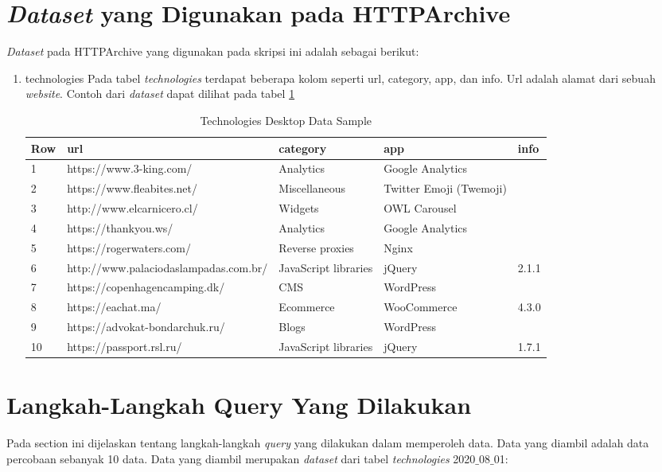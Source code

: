 \section{\textit{Dataset} yang Digunakan pada HTTPArchive}
\textit{Dataset} pada HTTPArchive yang digunakan pada skripsi ini adalah sebagai berikut:
\begin{enumerate}
	\item technologies
	Pada tabel \textit{technologies} terdapat beberapa kolom seperti url, category, app, dan info. Url adalah alamat dari sebuah \textit{website}. Contoh dari \textit{dataset} dapat dilihat pada tabel \ref{table:ct_tech_desktop} 
	\begin{table}[H]
		\centering
		\begin{tabular}{|l|l|p{3cm}|p{3cm}|l|}
			\hline
			\textbf{Row} & \textbf{url} & \textbf{category} & app & info\\
			\hline
			1 & https://www.3-king.com/ & Analytics & Google Analytics & \\
			\hline
			2 & https://www.fleabites.net/ & Miscellaneous & Twitter Emoji (Twemoji) & \\
			\hline
			3 & http://www.elcarnicero.cl/ & Widgets & OWL Carousel & \\
			\hline
			4 & https://thankyou.ws/ & Analytics & Google Analytics & \\
			\hline
			5 & https://rogerwaters.com/ & Reverse proxies & Nginx & \\
			\hline
			6 & http://www.palaciodaslampadas.com.br/ & JavaScript libraries & jQuery & 2.1.1\\
			\hline
			7 & https://copenhagencamping.dk/ & CMS & WordPress & \\
			\hline
			8 & https://eachat.ma/ & Ecommerce & WooCommerce & 4.3.0\\
			\hline
			9 & https://advokat-bondarchuk.ru/ & Blogs & WordPress & \\
			\hline
			10 & https://passport.rsl.ru/ & JavaScript libraries & jQuery & 1.7.1\\
			\hline
		\end{tabular}
		\caption{Technologies Desktop Data Sample}
		\label{table:ct_tech_desktop}
	\end{table}
\end{enumerate}

\section{Langkah-Langkah Query Yang Dilakukan}
\label{langkah_query}
Pada section ini dijelaskan tentang langkah-langkah \textit{query} yang dilakukan dalam memperoleh data. Data yang diambil adalah data percobaan sebanyak 10 data. Data yang diambil merupakan \textit{dataset} dari tabel \textit{technologies} 2020$\_$08$\_$01:

